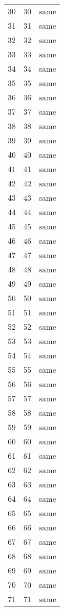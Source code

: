 \documentclass{article}%
\begin{document}
\begin{longtable}{lrl}
30  &   30 &  same \\
31  &   31 &  same \\
32  &   32 &  same \\
33  &   33 &  same \\
34  &   34 &  same \\
35  &   35 &  same \\
36  &   36 &  same \\
37  &   37 &  same \\
38  &   38 &  same \\
39  &   39 &  same \\
40  &   40 &  same \\
41  &   41 &  same \\
42  &   42 &  same \\
43  &   43 &  same \\
44  &   44 &  same \\
45  &   45 &  same \\
46  &   46 &  same \\
47  &   47 &  same \\
48  &   48 &  same \\
49  &   49 &  same \\
50  &   50 &  same \\
51  &   51 &  same \\
52  &   52 &  same \\
53  &   53 &  same \\
54  &   54 &  same \\
55  &   55 &  same \\
56  &   56 &  same \\
57  &   57 &  same \\
58  &   58 &  same \\
59  &   59 &  same \\
60  &   60 &  same \\
61  &   61 &  same \\
62  &   62 &  same \\
63  &   63 &  same \\
64  &   64 &  same \\
65  &   65 &  same \\
66  &   66 &  same \\
67  &   67 &  same \\
68  &   68 &  same \\
69  &   69 &  same \\
70  &   70 &  same \\
71  &   71 &  same \\

\end{longtable}
\end{document}
